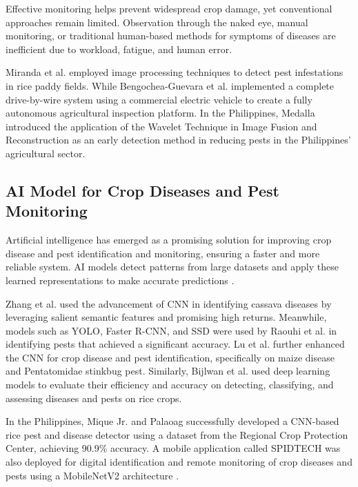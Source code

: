 \documentclass[journal]{./IEEE/IEEEtran}
\begin{document}
Effective monitoring helps prevent widespread crop damage, yet conventional approaches remain limited. Observation through the naked eye, manual monitoring, or traditional human-based methods for symptoms of diseases are inefficient due to workload, fatigue, and human error\cite{kolesnikova-2023}.

Miranda et al.\cite{miranda-2014} employed image processing techniques to detect pest infestations in rice paddy fields. While Bengochea-Guevara et al.\cite{Bengochea-Guevara_Montes_Andújar_Barra_Conejero_Ribeiro_2025} implemented a complete drive-by-wire system using a commercial electric vehicle to create a fully autonomous agricultural inspection platform. In the Philippines, Medalla \cite{Medalla_2018} introduced the application of the Wavelet Technique in Image Fusion and Reconstruction as an early detection method in reducing pests in the Philippines’ agricultural sector.
 
\subsection{AI Model for Crop Diseases and Pest Monitoring}
Artificial intelligence has emerged as a promising solution for improving crop disease and pest identification and monitoring, ensuring a faster and more reliable system. AI models detect patterns from large datasets and apply these learned representations to make accurate predictions \cite{ibm-2025}. 

Zhang et al. \cite{zhang-2024} used the advancement of CNN in identifying cassava diseases by leveraging salient semantic features and promising high returns. Meanwhile, models such as YOLO, Faster R-CNN, and SSD were used by Raouhi et al. \cite{raouhi-2022} in identifying pests that achieved a significant accuracy. Lu et al. \cite{lu-2025} further enhanced the CNN for crop disease and pest identification, specifically on maize disease and Pentatomidae stinkbug pest. Similarly, Bijlwan et al. \cite{bijlwan-2025} used deep learning models to evaluate their efficiency and accuracy on detecting, classifying, and assessing diseases and pests on rice crops.

In the Philippines, Mique Jr. and Palaoag \cite{mique-2018} successfully developed a CNN-based rice pest and disease detector using a dataset from the Regional Crop Protection Center, achieving 90.9\% accuracy. A mobile application called SPIDTECH was also deployed for digital identification and remote monitoring of crop diseases and pests using a MobileNetV2 architecture \cite{Guiam_Gutierrez_Gapasin_Matalog_Ebuenga_2021}.
\end{document}
